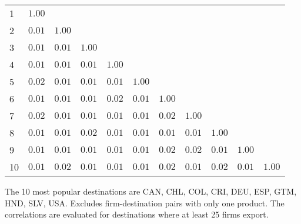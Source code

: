 \documentclass{article}
\begin{document}
\begin{table}[h]
{\begin{threeparttable}
\begin{tabular}{lrrrrrrrrrr}
\cmidrule{2-11} 
1  & $1.00$    &              &             &             &              &            &               &            &              &                        \\  
2  & $0.01$    & $1.00$     &             &             &              &            &               &            &              &                        \\  
3  & $0.01$    & $0.01$     & $1.00$    &             &              &            &               &            &              &                        \\  
4  & $0.01$    & $0.01$     & $0.01$    &  $1.00$   &              &            &               &            &              &                        \\  
5  & $0.02$    & $0.01$     & $0.01$    &  $0.01$   & $1.00$     &            &               &            &              &                        \\  
6  & $0.01$    & $0.01$     & $0.01$    &  $0.02$   & $0.01$     &  $1.00$  &               &            &              &                        \\  
7  & $0.02$    & $0.01$     & $0.01$    &  $0.01$   & $0.01$     &  $0.02$  &  $1.00$     &            &              &                        \\  
8  & $0.01$    & $0.01$     & $0.02$    &  $0.01$   & $0.01$     &  $0.01$  &  $0.01$     & $1.00$   &              &                        \\  
9  & $0.01$    & $0.01$     & $0.01$    &  $0.01$   & $0.01$     &  $0.02$  &  $0.02$     & $0.01$   & $1.00$     &                        \\  
10 & $0.01$   & $0.02$    & $0.01$   &  $0.01$  & $0.01$    &  $0.02$ &  $0.01$    & $0.02$  & $0.01$    &   $1.00$           \\  
\hline
\hline
\end{tabular}
\begin{tablenotes}
\small
\item  \noindent  \footnotesize{The 10 most popular destinations are CAN, CHL, COL, CRI, DEU, ESP, GTM, HND, SLV, USA. Excludes firm-destination pairs with only one product. The correlations are evaluated for destinations where at least 25 firms export.}
\end{tablenotes}
\end{threeparttable}
}
\end{table}
\end{document}
